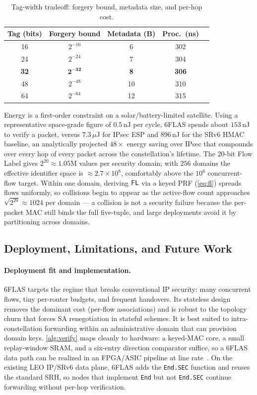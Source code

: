\begin{table}[t]
\centering
\caption{Tag-width tradeoff: forgery bound, metadata size, and per-hop cost.}
\label{tab:tag}
\renewcommand{\arraystretch}{1.2}
\begin{tabular}{ccccc}
\toprule
\textbf{Tag (bits)} & \textbf{Forgery bound} & \textbf{Metadata (B)} & \textbf{Proc.\ (ns)} \\
\midrule
16 & $2^{-16}$ & 6  & 302 \\
24 & $2^{-24}$ & 7  & 304 \\
\textbf{32} & $\mathbf{2^{-32}}$ & \textbf{8}  & \textbf{306} \\
48 & $2^{-48}$ & 10 & 310 \\
64 & $2^{-64}$ & 12 & 315 \\
\bottomrule
\end{tabular}
\end{table}

Energy is a first-order constraint on a solar/battery-limited satellite. Using a
representative space-grade figure of $0.5$\,nJ per cycle, 6FLAS spends about
$153$\,nJ to verify a packet, versus $7.3\,\mu$J for IPsec ESP and $896$\,nJ for
the SRv6 HMAC baseline, an analytically projected $48\times$ energy saving over IPsec that compounds over
every hop of every packet across the constellation's lifetime. The $20$-bit Flow
Label gives $2^{20}\approx1.05$M values per security domain; with $256$ domains
the effective identifier space is $\approx2.7\times10^8$, comfortably above the
$10^6$ concurrent-flow target. Within one domain, deriving $\mathsf{FL}$ via a keyed PRF
(\cref{eq:fl}) spreads flows uniformly, so collisions begin to appear as the
active-flow count approaches $\sqrt{2^{20}}\approx1024$ per domain — a collision
is not a security failure because the per-packet MAC still binds the full
five-tuple, and large deployments avoid it by partitioning across domains.

\subsection{Deployment, Limitations, and Future Work}
\label{sec:disc}

\paragraph{Deployment fit and implementation.}
6FLAS targets the regime that breaks conventional IP security: many concurrent
flows, tiny per-router budgets, and frequent handovers. Its stateless design
removes the dominant cost (per-flow associations) and is robust to the topology
churn that forces SA renegotiation in stateful schemes. It is best suited to
intra-constellation forwarding within an administrative domain that can
provision domain keys. \cref{alg:verify} maps cleanly to hardware: a keyed-MAC
core, a small replay-window SRAM, and a six-entry direction comparator suffice,
so a 6FLAS data path can be realized in an FPGA/ASIC pipeline at line
rate~\cite{li2022}. On the existing LEO IP/SRv6 data plane, 6FLAS
adds the \texttt{End.SEC} function and reuses the standard SRH, so nodes that
implement \texttt{End} but not \texttt{End.SEC} continue forwarding without per-hop verification.

